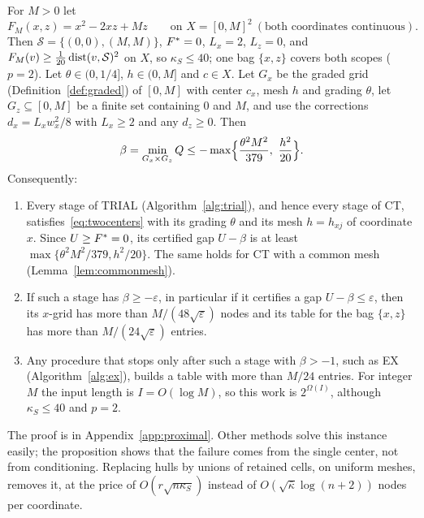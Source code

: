 \begin{proposition}
\label{prop:twocenters}
For $M>0$ let
\[
F_M(x,z)=x^2-2xz+Mz\qquad\text{on }X=[0,M]^2\ (\text{both coordinates
continuous}).
\]
Then $\mathcal S=\{(0,0),(M,M)\}$, $F^{*}=0$, $L_x=2$, $L_z=0$, and
$F_M(v)\ge\frac1{20}\operatorname{dist}(v,\mathcal S)^2$ on $X$, so $\kappa_S\le40$; one bag
$\{x,z\}$ covers both scopes ($p=2$). Let $\theta\in(0,1/4]$, $h\in(0,M]$ and
$c\in X$. Let $G_x$ be the graded grid (Definition~\ref{def:graded}) of
$[0,M]$ with center $c_x$, mesh $h$ and grading $\theta$, let $G_z\subseteq[0,M]$ be a finite set containing $0$
and $M$, and use the corrections $d_x=L_xw_x^2/8$ with $L_x\ge2$ and any
$d_z\ge0$. Then
\begin{equation}\label{eq:twocenters}
\beta=\min_{G_x\times G_z}Q\le-\max\Bigl\{\frac{\theta^2M^2}{379},\
\frac{h^2}{20}\Bigr\}.
\end{equation}
Consequently:
\begin{enumerate}[label=(\alph*)]
\item Every stage of TRIAL (Algorithm~\ref{alg:trial}), and hence every stage
of CT, satisfies~\eqref{eq:twocenters} with its grading $\theta$ and its mesh
$h=h_{xj}$ of coordinate $x$. Since $U\ge F^{*}=0$, its certified gap $U-\beta$
is at least $\max\{\theta^2M^2/379,h^2/20\}$. The same holds for CT with a
common mesh (Lemma~\ref{lem:commonmesh}).
\item If such a stage has $\beta\ge-\varepsilon$, in particular if it
certifies a gap $U-\beta\le\varepsilon$, then its $x$-grid has more than
$M/(48\sqrt\varepsilon)$ nodes and its table for the bag $\{x,z\}$ has more
than $M/(24\sqrt\varepsilon)$ entries.
\item Any procedure that stops only after such a stage with $\beta>-1$, such
as EX (Algorithm~\ref{alg:ex}), builds a table with more than $M/24$ entries.
For integer $M$ the input length is $I=O(\log M)$, so this work is
$2^{\Omega(I)}$, although $\kappa_S\le40$ and $p=2$.
\end{enumerate}
\end{proposition}

The proof is in Appendix~\ref{app:proximal}. Other methods solve this
instance easily; the proposition shows that the failure comes from the single
center, not from conditioning. Replacing hulls by unions of
retained cells, on uniform meshes, removes it, at the price of
$O(r\sqrt{n\kappa_S})$ instead of $O(\sqrt{\bar\kappa}\log(n+2))$ nodes per
coordinate.

